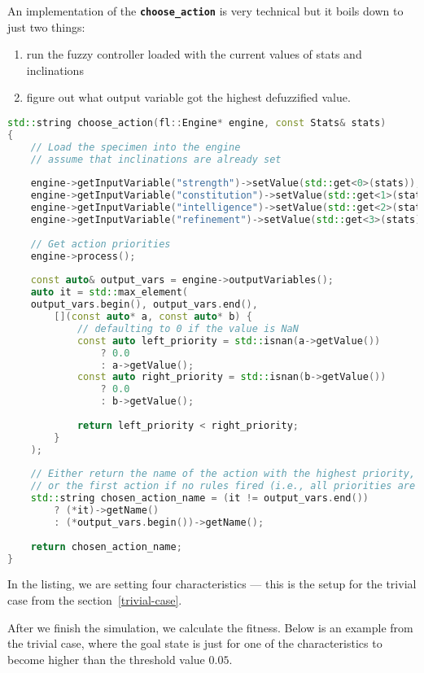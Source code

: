 \documentclass[12pt, a4paper]{report}
\begin{document}
	An implementation of the \textbf{\texttt{choose\_action}} is very technical but it boils down to just two things:
	
	\begin{enumerate}
		\item run the fuzzy controller loaded with the current values of stats and inclinations
		\item figure out what output variable got the highest defuzzified value.
	\end{enumerate}
	
	\begin{lstlisting}[language=c++]
std::string choose_action(fl::Engine* engine, const Stats& stats)
{
	// Load the specimen into the engine
	// assume that inclinations are already set
	
	engine->getInputVariable("strength")->setValue(std::get<0>(stats));
	engine->getInputVariable("constitution")->setValue(std::get<1>(stats));
	engine->getInputVariable("intelligence")->setValue(std::get<2>(stats));
	engine->getInputVariable("refinement")->setValue(std::get<3>(stats));
	
	// Get action priorities
	engine->process();
	
	const auto& output_vars = engine->outputVariables();
	auto it = std::max_element(
	output_vars.begin(), output_vars.end(),
		[](const auto* a, const auto* b) {
			// defaulting to 0 if the value is NaN
			const auto left_priority = std::isnan(a->getValue()) 
				? 0.0 
				: a->getValue();
			const auto right_priority = std::isnan(b->getValue()) 
				? 0.0 
				: b->getValue();
			
			return left_priority < right_priority;
		}
	);
	
	// Either return the name of the action with the highest priority,
	// or the first action if no rules fired (i.e., all priorities are 0).
	std::string chosen_action_name = (it != output_vars.end())
		? (*it)->getName()
		: (*output_vars.begin())->getName();
	
	return chosen_action_name;
}
	\end{lstlisting}

	In the listing, we are setting four characteristics --- this is the setup for the trivial case from the section~\ref{trivial-case}.
		
	After we finish the simulation, we calculate the fitness.
	Below is an example from the trivial case, where the goal state is just for one of the characteristics to become higher than the threshold value $0.05$.
	
\end{document}
